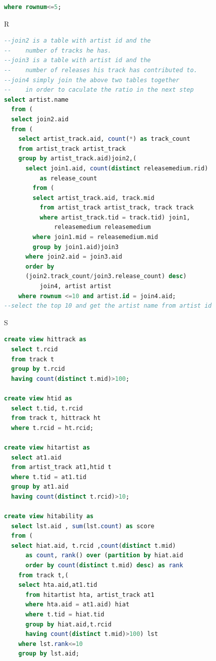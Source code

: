 \documentclass[11pt]{article} %
\begin{document}
{\begin{lstlisting}[language=SQL, keywordstyle=\color{blue!70},
commentstyle=\color{red!50!green!50!blue!50},
rulesepcolor=\color{red!20!green!20!blue!20},
frame=shadowbox]
  where rownum<=5;
\end{lstlisting}
R
\begin{lstlisting}[language=SQL, keywordstyle=\color{blue!70},
commentstyle=\color{red!50!green!50!blue!50},
rulesepcolor=\color{red!20!green!20!blue!20},
frame=shadowbox]
--join2 is a table with artist id and the
--    number of tracks he has.
--join3 is a table with artist id and the
--    number of releases his track has contributed to.
--join4 simply join the above two tables together
--    in order to caculate the ratio in the next step
select artist.name
  from (
  select join2.aid
  from (
    select artist_track.aid, count(*) as track_count
    from artist_track artist_track
    group by artist_track.aid)join2,(
      select join1.aid, count(distinct releasemedium.rid)
          as release_count
        from (
        select artist_track.aid, track.mid
          from artist_track artist_track, track track
          where artist_track.tid = track.tid) join1,
              releasemedium releasemedium
        where join1.mid = releasemedium.mid
        group by join1.aid)join3
      where join2.aid = join3.aid
      order by
      (join2.track_count/join3.release_count) desc)
          join4, artist artist
    where rownum <=10 and artist.id = join4.aid;
--select the top 10 and get the artist name from artist id
\end{lstlisting}
S
\begin{lstlisting}[language=SQL, keywordstyle=\color{blue!70},
commentstyle=\color{red!50!green!50!blue!50},
rulesepcolor=\color{red!20!green!20!blue!20},
frame=shadowbox]
create view hittrack as
  select t.rcid
  from track t
  group by t.rcid
  having count(distinct t.mid)>100;

create view htid as
  select t.tid, t.rcid
  from track t, hittrack ht
  where t.rcid = ht.rcid;

create view hitartist as
  select at1.aid
  from artist_track at1,htid t
  where t.tid = at1.tid
  group by at1.aid
  having count(distinct t.rcid)>10;

create view hitability as
  select lst.aid , sum(lst.count) as score
  from (
  select hiat.aid, t.rcid ,count(distinct t.mid)
      as count, rank() over (partition by hiat.aid
      order by count(distinct t.mid) desc) as rank
    from track t,(
    select hta.aid,at1.tid
      from hitartist hta, artist_track at1
      where hta.aid = at1.aid) hiat
      where t.tid = hiat.tid
      group by hiat.aid,t.rcid 
      having count(distinct t.mid)>100) lst
    where lst.rank<=10 
    group by lst.aid;


\end{lstlisting}}
\end{document}
